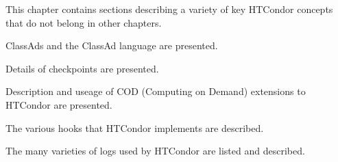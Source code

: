 This chapter contains sections describing a variety of key
HTCondor concepts that do not belong in other chapters.

ClassAds and the ClassAd language are presented.

Details of checkpoints are presented.

Description and useage of COD (Computing on Demand) extensions to HTCondor
are presented.

The various hooks that HTCondor implements are described.

The many varieties of logs used by HTCondor are listed and described.







